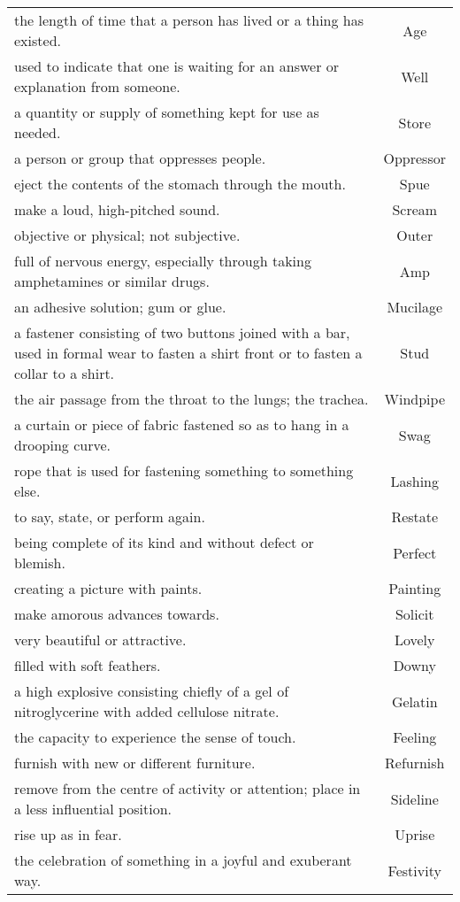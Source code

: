 \documentclass{article}
\begin{document}
\begin{longtable}{p{12cm}c}
the length of time that a person has lived or a thing has existed. & Age\\
used to indicate that one is waiting for an answer or explanation from someone. & Well\\
a quantity or supply of something kept for use as needed. & Store\\
a person or group that oppresses people. & Oppressor\\
eject the contents of the stomach through the mouth. & Spue\\
make a loud, high-pitched sound. & Scream\\
objective or physical; not subjective. & Outer\\
full of nervous energy, especially through taking amphetamines or similar drugs. & Amp\\
an adhesive solution; gum or glue. & Mucilage\\
a fastener consisting of two buttons joined with a bar, used in formal wear to fasten a shirt front or to fasten a collar to a shirt. & Stud\\
the air passage from the throat to the lungs; the trachea. & Windpipe\\
a curtain or piece of fabric fastened so as to hang in a drooping curve. & Swag\\
rope that is used for fastening something to something else. & Lashing\\
to say, state, or perform again. & Restate\\
being complete of its kind and without defect or blemish. & Perfect\\
creating a picture with paints. & Painting\\
make amorous advances towards. & Solicit\\
very beautiful or attractive. & Lovely\\
filled with soft feathers. & Downy\\
a high explosive consisting chiefly of a gel of nitroglycerine with added cellulose nitrate. & Gelatin\\
the capacity to experience the sense of touch. & Feeling\\
furnish with new or different furniture. & Refurnish\\
remove from the centre of activity or attention; place in a less influential position. & Sideline\\
rise up as in fear. & Uprise\\
the celebration of something in a joyful and exuberant way. & Festivity\\

\end{longtable}
\end{document}
